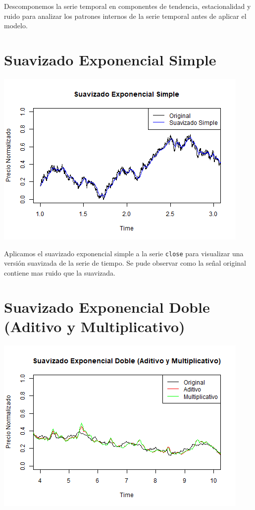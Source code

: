 \documentclass[
]{book}
\begin{document}
Descomponemos la serie temporal en componentes de tendencia, estacionalidad y ruido para analizar los patrones internos de la serie temporal antes de aplicar el modelo.

\section{Suavizado Exponencial Simple}\label{suavizado-exponencial-simple}

\includegraphics{bookdown_time_series_files/figure-latex/suavizado-simple-1.png}

Aplicamos el suavizado exponencial simple a la serie \texttt{close} para visualizar una versión suavizada de la serie de tiempo. Se pude observar como la señal original contiene mas ruido que la suavizada.

\section{Suavizado Exponencial Doble (Aditivo y Multiplicativo)}\label{suavizado-exponencial-doble-aditivo-y-multiplicativo}

\includegraphics{bookdown_time_series_files/figure-latex/suavizado-doble-1.png}
\end{document}
